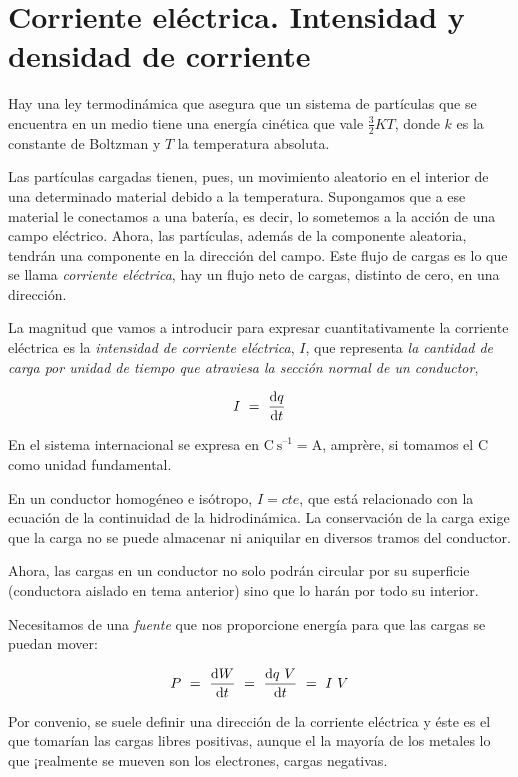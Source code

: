 \section[Corriente eléctrica. Intensidad y densidad de corriente]{Corriente eléctrica. Intensidad y densidad de corriente}

Hay una ley termodinámica que asegura que un sistema de partículas que se encuentra en un medio tiene una energía cinética que vale $\frac 3 2 KT$, 	donde $k$ es la constante de Boltzman y $T$ la temperatura absoluta.

Las partículas cargadas tienen, pues, un movimiento aleatorio en el interior de una determinado material debido a la temperatura. Supongamos que a ese material le conectamos a una batería, es decir, lo sometemos a la acción de una campo eléctrico. Ahora, las partículas, además de la componente aleatoria, tendrán una componente en la dirección del campo. Este flujo de cargas es lo que se llama \emph{corriente eléctrica}, hay un flujo neto de cargas, distinto de cero, en una dirección.

La magnitud que vamos a introducir para expresar cuantitativamente la corriente eléctrica es la \emph{intensidad de corriente eléctrica}, $I$, que representa \emph{la cantidad de carga por unidad de tiempo que atraviesa la sección normal de un conductor},

\begin{equation}
I\ = \ \dv{q}{t}	
\end{equation}

En el sistema internacional se expresa en $\mathrm{C\ s}^{–1}=\mathrm{A}$, amprère,  si tomamos el $\mathrm{C}$ como unidad fundamental. 

En un conductor homogéneo e isótropo, $I=cte$, que está relacionado con la ecuación de la continuidad de la hidrodinámica. La conservación de la carga exige que la carga no se puede almacenar ni aniquilar en diversos tramos del conductor.

Ahora, las cargas en un conductor no solo podrán circular por su superficie (conductora aislado en tema anterior) sino que lo harán por todo su interior.

Necesitamos de una \emph{fuente} que nos proporcione energía para que las cargas se puedan mover:

$$\displaystyle P\ =\ \dv{W}{t}\ = \ \dv{ q \ V}{t}\ =\ I\ V$$

Por convenio, se suele definir una dirección de la corriente eléctrica y éste es el que tomarían las cargas libres positivas, aunque el la mayoría de los metales lo que ¡realmente se mueven son los electrones, cargas negativas.

